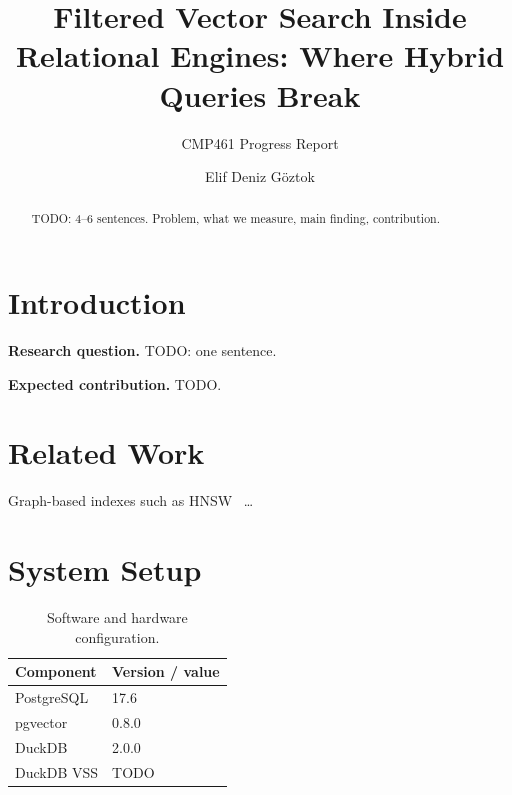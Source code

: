 \documentclass[sigconf,nonacm]{acmart}
\begin{document}
\title{Filtered Vector Search Inside Relational Engines: Where Hybrid Queries Break}
\subtitle{CMP461 Progress Report}

\author{Elif Deniz G\"{o}ztok}

\begin{abstract}
TODO: 4--6 sentences. Problem, what we measure, main finding, contribution.
\end{abstract}

\maketitle

\section{Introduction}

\textbf{Research question.} TODO: one sentence.

\textbf{Expected contribution.} TODO.

\section{Related Work}
Graph-based indexes such as HNSW~\cite{malkov2020hnsw} \ldots

\section{System Setup}

\begin{table}[h]
  \caption{Software and hardware configuration.}
  \label{tab:setup}
  \begin{tabular}{ll}
    \toprule
    Component & Version / value \\
    \midrule
    PostgreSQL & 17.6 \\
    pgvector & 0.8.0 \\
    DuckDB & 2.0.0 \\
    DuckDB VSS & TODO \\
    \bottomrule
  \end{tabular}
\end{table}
\end{document}
